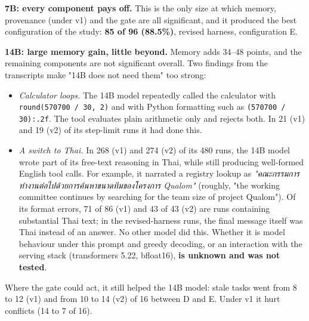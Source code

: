 \documentclass[10.5pt,a4paper,oneside]{report}
\begin{document}
\textbf{7B: every component pays off.} This is the only size at which memory, provenance (under v1) and the gate are all significant, and it produced the best configuration of the study: \textbf{85 of 96 (88.5\%)}, revised harness, configuration E.

\textbf{14B: large memory gain, little beyond.} Memory adds 34–48 points, and the remaining components are not significant overall. Two findings from the transcripts make "14B does not need them" too strong:

\begin{itemize}
\item \emph{Calculator loops.} The 14B model repeatedly called the calculator with \texttt{round(570700 /\allowbreak{} 30, 2)} and with Python formatting such as \texttt{(570700 /\allowbreak{} 30):.\allowbreak{}2f}. The tool evaluates plain arithmetic only and rejects both. In 21 (v1) and 19 (v2) of its step-limit runs it had done this.
\item \emph{A switch to Thai.} In 268 (v1) and 274 (v2) of its 480 runs, the 14B model wrote part of its free-text reasoning in Thai, while still producing well-formed English tool calls. For example, it narrated a registry lookup as \emph{"{\thaifont คณะกรรมการทำงานต่อไปด้วยการค้นหาขนาดทีมของโครงการ} Qualom"} (roughly, "the working committee continues by searching for the team size of project Qualom"). Of its format errors, 71 of 86 (v1) and 43 of 43 (v2) are runs containing substantial Thai text; in the revised-harness runs, the final message itself was Thai instead of an answer. No other model did this. Whether it is model behaviour under this prompt and greedy decoding, or an interaction with the serving stack (transformers 5.22, bfloat16), \textbf{is unknown and was not tested}.
\end{itemize}
Where the gate could act, it still helped the 14B model: stale tasks went from 8 to 12 (v1) and from 10 to 14 (v2) of 16 between D and E. Under v1 it hurt conflicts (14 to 7 of 16).
\end{document}
